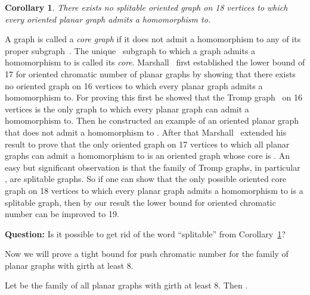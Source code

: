 \documentclass[10pt]{article}
\newtheorem{corollary}[theorem]{Corollary}
\begin{document}
\begin{corollary}\label{cor 19?}
There exists no splitable oriented graph on 18 vertices to which every oriented planar graph admits a homomorphism to. 
\end{corollary}

A graph is called a \textit{core graph} if it does not admit a homomorphism to any of its proper subgraph~\cite{hell}.  The unique~\cite{hell} subgraph to which 
a graph admits a homomorphism to is called its \textit{core}. 
Marshall~\cite{marshall17} first established the lower bound of 17 for oriented chromatic number of planar graphs by showing that there exists no oriented graph on 16 vertices to which every planar graph admits a homomorphism to. 
For proving this first he showed that the Tromp graph~\cite{marshall17}  on 16 vertices is the only graph to which every planar graph can admit a homomorphism to. Then he constructed an example of an oriented planar graph that does not admit a homomorphism to .
After that Marshall~\cite{marshall18} extended his result to prove that the only oriented graph on 17 vertices to which all planar graphs can admit a homomorphism to is an oriented graph whose core is . 
An easy but significant observation is that the family of Tromp graphs, in particular , are splitable graphs. 
So if one can show that the only possible oriented core graph on 18 vertices to which every planar graph admits a homomorphism to is a splitable graph, then by our result the lower bound for oriented chromatic number can be improved to 19.

\medskip

\noindent \textbf{Question:} Is it possible to get rid of the word ``splitable'' from Corollary~\ref{cor 19?}?

\medskip
   
Now we will prove a tight bound for push chromatic number for the family of planar graphs with girth at least 8.



















\begin{theorem}\label{th p8}
Let  be the family of all planar graphs with girth at least 8. Then . 
\end{theorem}
\end{document}
